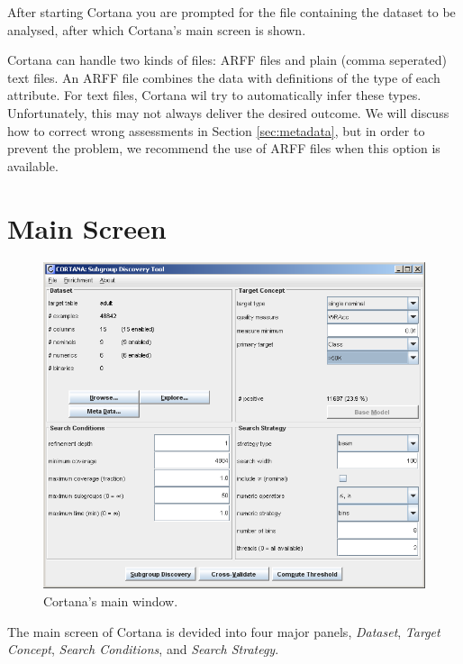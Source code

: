 \documentclass{article}
\begin{document}
After starting Cortana you are prompted for the file containing the dataset
to be analysed, after which Cortana's main screen is shown.

Cortana can handle two kinds of files: ARFF files and
plain (comma seperated) text files.  
An ARFF file combines the data with definitions of the \gls{type} of
each attribute.  
For text files, Cortana wil try to automatically infer these \gls{type}s.
Unfortunately, this may not always deliver the desired outcome.  We will
discuss how to correct wrong assessments in Section \ref{sec:metadata}, but
in order to prevent the problem, we recommend the use of ARFF files when
this option is available.

\section{Main Screen}

\begin{figure}
\begin{center}
\includegraphics[width=\textwidth]{miningwindow_r1011.png}
\caption{Cortana's main window.}
\label{fig:mainwindow}
\end{center}
\end{figure}

The main screen of Cortana is devided into four major panels,
\emph{Dataset}, \emph{Target Concept}, \emph{Search Conditions}, and
\emph{Search Strategy}.
\end{document}
